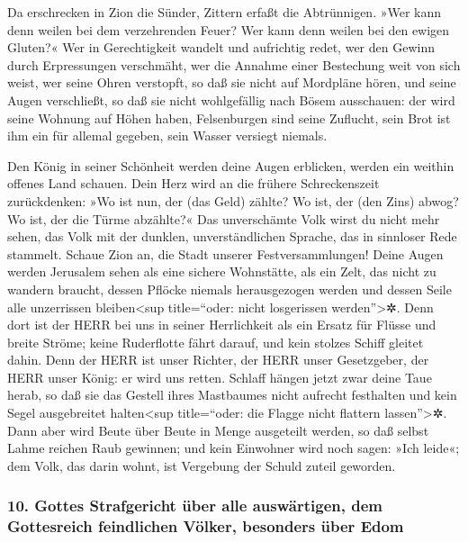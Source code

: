 Da erschrecken in Zion die Sünder, Zittern erfaßt die
Abtrünnigen. »Wer kann denn weilen bei dem verzehrenden Feuer? Wer kann
denn weilen bei den ewigen Gluten?« Wer in Gerechtigkeit
wandelt und aufrichtig redet, wer den Gewinn durch Erpressungen
verschmäht, wer die Annahme einer Bestechung weit von sich weist, wer
seine Ohren verstopft, so daß sie nicht auf Mordpläne hören, und seine
Augen verschließt, so daß sie nicht wohlgefällig nach Bösem ausschauen:
der wird seine Wohnung auf Höhen haben, Felsenburgen sind
seine Zuflucht, sein Brot ist ihm ein für allemal gegeben, sein Wasser
versiegt niemals.

Den König in seiner Schönheit werden deine Augen
erblicken, werden ein weithin offenes Land schauen. Dein
Herz wird an die frühere Schreckenszeit zurückdenken: »Wo ist nun, der
(das Geld) zählte? Wo ist, der (den Zins) abwog? Wo ist, der die Türme
abzählte?« Das unverschämte Volk wirst du nicht mehr
sehen, das Volk mit der dunklen, unverständlichen Sprache, das in
sinnloser Rede stammelt. Schaue Zion an, die Stadt
unserer Festversammlungen! Deine Augen werden Jerusalem sehen als eine
sichere Wohnstätte, als ein Zelt, das nicht zu wandern braucht, dessen
Pflöcke niemals herausgezogen werden und dessen Seile alle unzerrissen
bleiben\textless sup title=``oder: nicht losgerissen
werden''\textgreater✲. Denn dort ist der HERR bei uns in
seiner Herrlichkeit als ein Ersatz für Flüsse und breite Ströme; keine
Ruderflotte fährt darauf, und kein stolzes Schiff gleitet dahin.
Denn der HERR ist unser Richter, der HERR unser
Gesetzgeber, der HERR unser König: er wird uns retten.
Schlaff hängen jetzt zwar deine Taue herab, so daß sie
das Gestell ihres Mastbaumes nicht aufrecht festhalten und kein Segel
ausgebreitet halten\textless sup title=``oder: die Flagge nicht flattern
lassen''\textgreater✲. Dann aber wird Beute über Beute in Menge
ausgeteilt werden, so daß selbst Lahme reichen Raub gewinnen;
und kein Einwohner wird noch sagen: »Ich leide«; dem
Volk, das darin wohnt, ist Vergebung der Schuld zuteil geworden.

\hypertarget{gottes-strafgericht-uxfcber-alle-auswuxe4rtigen-dem-gottesreich-feindlichen-vuxf6lker-besonders-uxfcber-edom}{%
\subsubsection{10. Gottes Strafgericht über alle auswärtigen, dem
Gottesreich feindlichen Völker, besonders über
Edom}\label{gottes-strafgericht-uxfcber-alle-auswuxe4rtigen-dem-gottesreich-feindlichen-vuxf6lker-besonders-uxfcber-edom}}

